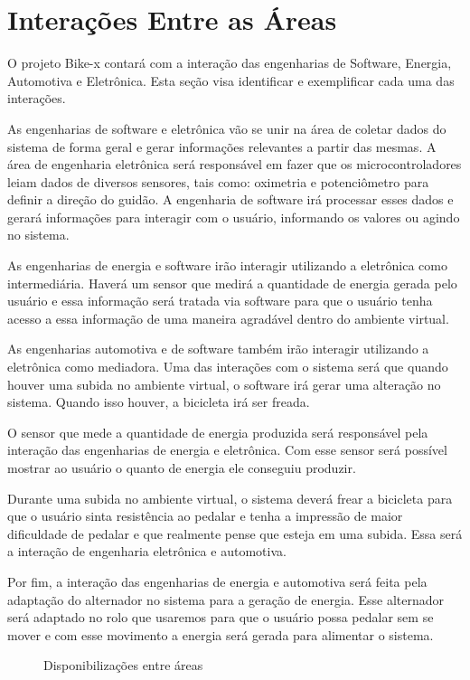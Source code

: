 \chapter[Interações]{Interações Entre as Áreas}

O projeto Bike-x contará com a interação das engenharias de Software, Energia, Automotiva e Eletrônica. Esta seção visa identificar e exemplificar cada uma 
das interações. 

As engenharias de software e eletrônica vão se unir na área de coletar dados do sistema de forma geral e gerar informações relevantes a partir das mesmas. 
A área de engenharia eletrônica será responsável em fazer que os microcontroladores leiam dados de diversos sensores, tais como: oximetria e potenciômetro para 
definir a direção do guidão.  A engenharia de software irá processar esses dados e gerará informações para interagir com o usuário, informando os valores ou 
agindo no sistema.

As engenharias de energia e software irão interagir utilizando a eletrônica como intermediária. Haverá um sensor que medirá a quantidade de energia gerada 
pelo usuário e essa informação será tratada via software para que o usuário tenha acesso a essa informação de uma maneira agradável dentro do ambiente virtual.

As engenharias automotiva e de software também irão interagir utilizando a eletrônica como mediadora. Uma das interações com o sistema será que quando houver 
uma subida no ambiente virtual, o software irá gerar uma alteração no sistema. Quando isso houver, a bicicleta irá ser freada.

O sensor que mede a quantidade de energia produzida será responsável pela interação das engenharias de energia e eletrônica. Com esse sensor será possível 
mostrar ao usuário o quanto de energia ele conseguiu produzir. 

Durante uma subida no ambiente virtual, o sistema deverá frear a bicicleta para que o usuário sinta resistência ao pedalar e tenha a impressão de maior 
dificuldade de pedalar e que realmente pense que esteja em uma subida. Essa será a interação de engenharia eletrônica e automotiva.

Por fim, a interação das engenharias de energia e automotiva será feita pela adaptação do alternador no sistema para a geração de energia. Esse alternador 
será adaptado no rolo que usaremos para que o usuário possa pedalar sem se mover e com esse movimento a energia será gerada para alimentar o sistema.

\begin{figure}[h]
  \centering
  
  \caption{Disponibilizações entre áreas}
  \label{intera}
\end{figure}

